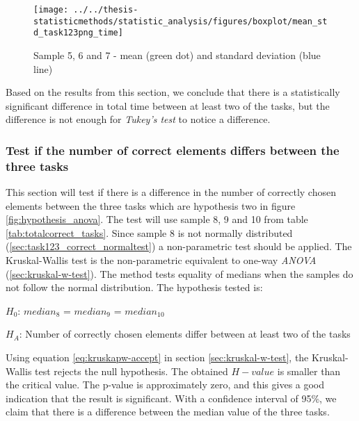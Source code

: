 \begin{figure}[H]
	\centering
	\texttt{[image: ../../thesis-statisticmethods/statistic\_analysis/figures/boxplot/mean\_std\_task123png\_time]}
	\caption{Sample 5, 6 and 7 - mean (green dot) and standard deviation (blue line)}
	\label{fig:meanstdtask123pngtime}
\end{figure}

\vspace{0.3cm}
Based on the results from this section, we conclude that there is a statistically significant difference in total time between at least two of the tasks, but the difference is not enough for \textit{Tukey's test} to notice a difference. 

\subsubsection[Sample 8, 9, and 10]{Test if the number of correct elements differs between the three tasks}\label{sec:sample_8_9_10_kruskal)} %
This section will test if there is a difference in the number of correctly chosen elements between the three tasks which are hypothesis two in figure \ref{fig:hypothesis_anova}. The test will use sample 8, 9 and 10 from table \ref{tab:totalcorrect_tasks}. Since sample 8 is not normally distributed (\ref{sec:task123_correct_normaltest}) a non-parametric test should be applied. The Kruskal-Wallis test is the non-parametric equivalent to one-way \textit{ANOVA} (\ref{sec:kruskal-w-test}). The method tests equality of medians when the samples do not follow the normal distribution. The hypothesis tested is: \\[0.2cm]

\centerline{$H_{0}$: $median_8$ = $median_9$ = $median_{10}$}
\centerline{$H_{A}$: Number of correctly chosen elements differ between at least two of the tasks}
\vspace{0.2cm}

Using equation \ref{eq:kruskapw-accept} in section \ref{sec:kruskal-w-test}, the Kruskal-Wallis test rejects the null hypothesis. The obtained $H-value$ is smaller than the critical value. The p-value is approximately zero, and this gives a good indication that the result is significant. With a confidence interval of 95\%, we claim that there is a difference between the median value of the three tasks. \\[0.2cm]


